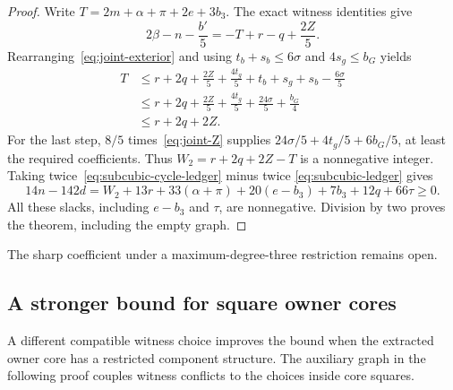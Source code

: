 \documentclass[11pt]{article}
\begin{document}
\begin{proof}
Write $T=2m+\alpha+\pi+2e+3b_3$. The exact witness identities give
\[
 2\beta-n-\frac{b'}5=-T+r-q+\frac{2Z}{5}.
\]
Rearranging~\eqref{eq:joint-exterior} and using
$t_b+s_b\le6\sigma$ and $4s_g\le b_G$ yields
\begin{align*}
 T&\le r+2q+\frac{2Z}{5}+\frac{4t_g}{5}+t_b
                +s_g+s_b-\frac{6\sigma}{5}\\
  &\le r+2q+\frac{2Z}{5}+\frac{4t_g}{5}
                +\frac{24\sigma}{5}+\frac{b_G}{4}\\
  &\le r+2q+2Z.
\end{align*}
For the last step, $8/5$ times~\eqref{eq:joint-Z} supplies
$24\sigma/5+4t_g/5+6b_G/5$, at least the required coefficients.
Thus $W_2=r+2q+2Z-T$ is a nonnegative integer.
Taking twice~\eqref{eq:subcubic-cycle-ledger} minus twice
\eqref{eq:subcubic-ledger} gives
\[
 14n-142d=W_2+13r+33(\alpha+\pi)+20(e-b_3)
             +7b_3+12q+66\tau\ge0.
\]
All these slacks, including $e-b_3$ and $\tau$, are nonnegative.
Division by two proves the theorem, including the empty graph.
\end{proof}

The sharp coefficient under a maximum-degree-three restriction remains open.

\subsection{A stronger bound for square owner cores}

A different compatible witness choice improves the bound when the extracted
owner core has a restricted component structure. The auxiliary graph in the
following proof couples witness conflicts to the choices inside core squares.
\end{document}
